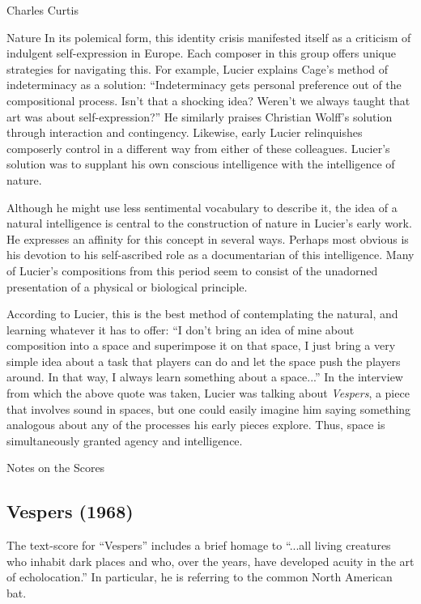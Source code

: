 \documentclass[a4paper,10pt]{report}
\numberwithin{equation}{section}
\begin{document}
\begin{chapter}{Charles Curtis}
\begin{section}{Nature}
In its polemical form, this identity crisis manifested itself as a criticism of indulgent self-expression in Europe. Each composer in this group offers unique strategies for navigating this. For example, Lucier explains Cage's method of indeterminacy as a solution: ``Indeterminacy gets personal preference out of the compositional process. Isn't that a shocking idea? Weren't we always taught that art was about self-expression?''\cite[p.~11]{lucier2012} He similarly praises Christian Wolff's solution through interaction and contingency.\cite[p.~46]{lucier2012} Likewise, early Lucier relinquishes composerly control in a different way from either of these colleagues. Lucier's solution was to supplant his own conscious intelligence with the intelligence of nature. 

Although he might use less sentimental vocabulary to describe it, the idea of a natural intelligence is central to the construction of nature in Lucier's early work. He expresses an affinity for this concept in several ways. Perhaps most obvious is his devotion to his self-ascribed role as a documentarian of this intelligence. Many of Lucier's compositions from this period seem to consist of the unadorned presentation of a physical or biological principle. 

According to Lucier, this is the best method of contemplating the natural, and learning whatever it has to offer: ``I don't bring an idea of mine about composition into a space and superimpose it on that space, I just bring a very simple idea about a task that players can do and let the space push the players around. In that way, I always learn something about a space...''\cite[p.~78]{lucier1995} In the interview from which the above quote was taken, Lucier was talking about \emph{Vespers}, a piece that involves sound in spaces, but one could easily imagine him saying something analogous about any of the processes his early pieces explore. Thus, space is simultaneously granted agency and intelligence.  
\end{section}
\begin{section}{Notes on the Scores}
 \subsection{Vespers (1968)}

The text-score for ``Vespers'' includes a brief homage to ``...all living creatures who inhabit dark places and who, over the years, have developed acuity in the art of echolocation.''\cite[p.~312]{lucier1995} In particular, he is referring to the common North American bat.\cite[p.~86]{lucier2012} 


\end{section}
\end{chapter}
\end{document}
